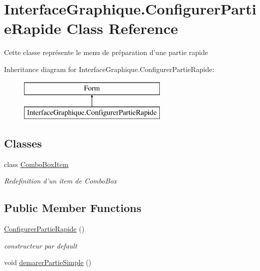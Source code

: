 \hypertarget{class_interface_graphique_1_1_configurer_partie_rapide}{\section{Interface\-Graphique.\-Configurer\-Partie\-Rapide Class Reference}
\label{class_interface_graphique_1_1_configurer_partie_rapide}
}


Cette classe représente le menu de préparation d'une partie rapide  


Inheritance diagram for Interface\-Graphique.\-Configurer\-Partie\-Rapide\-:\begin{figure}[H]
\begin{center}
\leavevmode
\includegraphics[height=2.000000cm]{class_interface_graphique_1_1_configurer_partie_rapide}
\end{center}
\end{figure}
\subsection*{Classes}
\begin{DoxyCompactItemize}
\item 
class \hyperlink{class_interface_graphique_1_1_configurer_partie_rapide_1_1_combo_box_item}{Combo\-Box\-Item}
\begin{DoxyCompactList}\small\item\em Redefinition d'un item de Combo\-Box \end{DoxyCompactList}\end{DoxyCompactItemize}
\subsection*{Public Member Functions}
\begin{DoxyCompactItemize}
\item 
\hyperlink{class_interface_graphique_1_1_configurer_partie_rapide_a3e4cee4d4699fc886275a34c7bd52009}{Configurer\-Partie\-Rapide} ()
\begin{DoxyCompactList}\small\item\em constructeur par default \end{DoxyCompactList}\item 
void \hyperlink{class_interface_graphique_1_1_configurer_partie_rapide_a9d6f766fc8fd2f1e4ff8913588d044e4}{demarer\-Partie\-Simple} ()
\end{DoxyCompactItemize}
